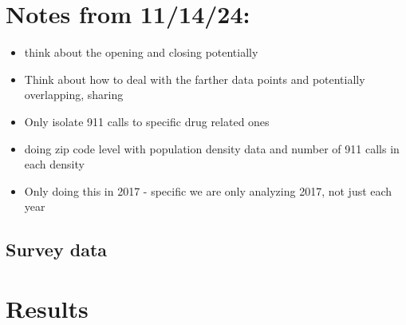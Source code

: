 \documentclass[12pt]{article}
\begin{document}
\section{Notes from 11/14/24:}
\begin{itemize}
    \item think about the opening and closing potentially
    \item Think about how to deal with the farther data points and potentially overlapping, sharing
    \item Only isolate 911 calls to specific drug related ones 
    \item doing zip code level with population density data and number of 911 calls in each density
    \item Only doing this in 2017 - specific we are only analyzing 2017, not just each year
    \end{itemize}
\subsection{Survey data}

\section{Results}
\label{sec:result}

\end{document}
